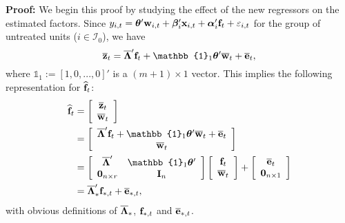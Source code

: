 \documentclass[12pt,fleqn]{article}
\begin{document}
\noindent\textbf{Proof:} We begin this proof by studying the effect of the new regressors on the estimated factors. Since $y_{i,t} = \boldsymbol{\theta}'\mathbf{w}_{i,t} + \boldsymbol{\beta}_i'\mathbf{x}_{i,t} + \boldsymbol{\alpha}_i'\mathbf{f}_t + \varepsilon_{i,t}$ for the group of untreated units ($i \in \mathcal{I}_0$), we have
\begin{equation}
\overline{\*{z}}_t = \overline{\+\Lambda}'\*{f}_t + \mathbb{1}_{1}\+\theta'\overline {\*w}_{t} + \overline {\*e}_{t},
\end{equation}
where $\mathbb{1}_1 := [1,0,...,0]'$ is a $(m+1)\times 1$ vector. This implies the following representation for $\widehat{\mathbf{f}}_{t}$:
\begin{align}
\widehat{\*{f}}_{t} & = \left[ \begin{array}{c}
                         \overline{\*{z}}_t \\
                         \overline{\*{w}}_t
                          \end{array}
\right] \notag\\
&= \left[ \begin{array}{c}
                         \overline{\+\Lambda}'\*{f}_t + \mathbb{1}_{1}\+\theta'\overline {\*w}_{t} + \overline {\*e}_{t} \\
                          \overline{\*{w}}_t
                          \end{array}
\right] \notag\\
&= \left[ \begin{array}{cc}
                          \overline{\+\Lambda}' & \mathbb{1}_{1}\+\theta' \\
                          \*0_{n\times r} & \*I_{n}
                          \end{array}
\right]\left[ \begin{array}{c}
                          \*{f}_t \\
                          \overline{\*{w}}_t
                          \end{array}
\right] + \left[ \begin{array}{c}
                          \overline{\*{e}}_t \\
                          \*0_{n\times 1}
                          \end{array}
\right] \notag\\
& = \overline{\+\Lambda}_*'\*{f}_{*,t} + \overline{\*{e}}_{*,t},
\end{align}
with obvious definitions of $\overline{\boldsymbol{\Lambda}}_*$, $\mathbf{f}_{*,t}$ and $\overline{\mathbf{e}}_{*,t}$.
\end{document}

